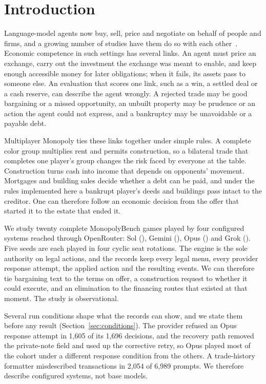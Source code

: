 \section{Introduction}
\label{sec:intro}

Language-model agents now buy, sell, price and negotiate on behalf of people and firms, and a growing number of studies have them do so with each other~\cite{li2026arena,liang2026supplychain,chen2026ceobench}. Economic competence in such settings has several links. An agent must price an exchange, carry out the investment the exchange was meant to enable, and keep enough accessible money for later obligations; when it fails, its assets pass to someone else. An evaluation that scores one link, such as a win, a settled deal or a cash reserve, can describe the agent wrongly. A rejected trade may be good bargaining or a missed opportunity, an unbuilt property may be prudence or an action the agent could not express, and a bankruptcy may be unavoidable or a payable debt.

Multiplayer Monopoly ties these links together under simple rules. A complete color group multiplies rent and permits construction, so a bilateral trade that completes one player's group changes the risk faced by everyone at the table. Construction turns cash into income that depends on opponents' movement. Mortgages and building sales decide whether a debt can be paid, and under the rules implemented here a bankrupt player's deeds and buildings pass intact to the creditor. One can therefore follow an economic decision from the offer that started it to the estate that ended it.

We study twenty complete MonopolyBench games played by four configured systems reached through OpenRouter: Sol (), Gemini (), Opus () and Grok (). Five seeds are each played in four cyclic seat rotations. The engine is the sole authority on legal actions, and the records keep every legal menu, every provider response attempt, the applied action and the resulting events. We can therefore tie bargaining text to the terms on offer, a construction request to whether it could execute, and an elimination to the financing routes that existed at that moment. The study is observational.

Several run conditions shape what the records can show, and we state them before any result (Section~\ref{sec:conditions}). The provider refused an Opus response attempt in 1,605 of its 1,696 decisions, and the recovery path removed the private-note field and used up the corrective retry, so Opus played most of the cohort under a different response condition from the others. A trade-history formatter misdescribed transactions in 2,054 of 6,989 prompts. We therefore describe configured systems, not base models.

